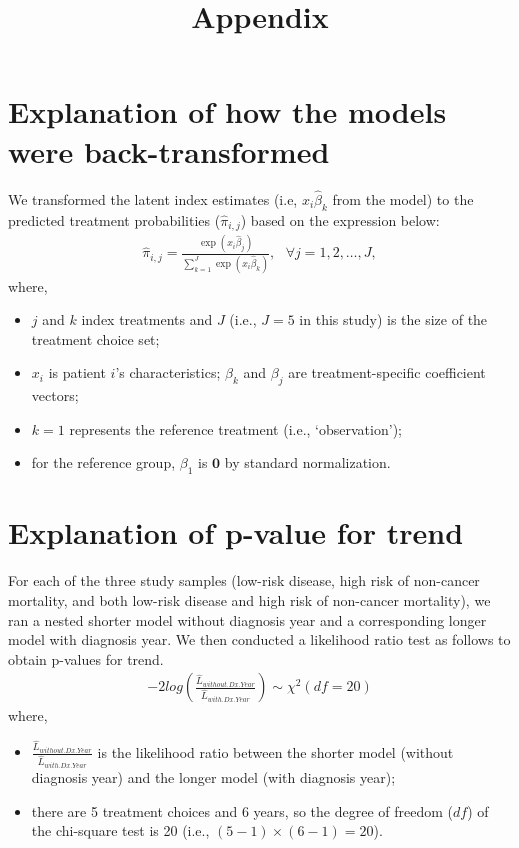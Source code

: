 \documentclass[12pt]{article}
\title{\huge \bf Appendix}
\author{}
\date{}
\begin{document}
\maketitle
\vspace{-25mm}

\section{Explanation of how the models were back-transformed}
We transformed the latent index estimates (i.e, $x_{i}\hat{\beta}_{k}$ from the model) to the predicted treatment probabilities ($\hat{\pi}_{i,j}$) based on the expression below:
\begin{align}
\hat{\pi}_{i,j}=\frac{\exp(x_{i}\hat{\beta}_{j})}{\sum^{J}_{k=1}\exp(x_{i}\hat{\beta}_{k})}, \text{    } \forall j=1,2,\ldots,J,\nonumber
\end{align}
where, 
\begin{itemize}
\item $j$ and $k$ index treatments and $J$ (i.e., $J=5$ in this study) is the size of the treatment choice set;
\item  $x_{i}$ is patient $i$'s characteristics; $\beta_{k}$ and $\beta_{j}$ are treatment-specific coefficient vectors;  
\item $k=1$ represents the reference treatment (i.e., `observation');
\item  for the reference group, $\beta_{1}$ is $\boldsymbol{0}$ by standard normalization.
\end{itemize}

\section{Explanation of p-value for trend}
For each of the three study samples (low-risk disease, high risk of non-cancer mortality, and both low-risk disease and high risk of non-cancer mortality), we ran a nested shorter model without diagnosis year and a corresponding longer model with diagnosis year. We then conducted a likelihood ratio test as follows to obtain p-values for trend.
\begin{align}
-2log\left(\frac{\hat{L}_{without.Dx.Year}}{\hat{L}_{with.Dx.Year}}\right) \sim \chi^{2}(df=20) \nonumber
\end{align}
where,
\begin{itemize}
\item $\frac{\hat{L}_{without.Dx.Year}}{\hat{L}_{with.Dx.Year}}$ is the likelihood ratio between the shorter model (without diagnosis year) and the longer model (with diagnosis year);
\item there are 5 treatment choices and 6 years, so the degree of freedom ($df$) of the chi-square test is 20 (i.e., $(5-1)\times (6-1)=20$).
\end{itemize}
\end{document}
